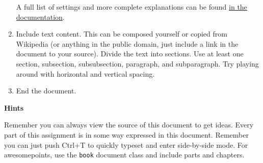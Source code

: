 \documentclass[a4paper,10pt]{article}
\begin{document}
\begin{enumerate}
\vspace{1em}

A full list of settings and more complete explanations can be found
\href{ftp://ftp.tex.ac.uk/tex-archive/macros/latex/contrib/geometry/geometry.pdf}{in
the documentation}.

\vspace{1em}

\item Include text content. This can be composed yourself or copied from
Wikipedia (or anything in the public domain, just include a link in the document
to your source). Divide the text into sections. Use at least one section,
subsection, subsubsection, paragraph, and subparagraph. Try playing around with horizontal and vertical spacing.

\item End the document.

\end{enumerate}

\noindent\large{\textbf{Hints}}\normalsize

Remember you can always view the source of this document to get ideas. Every
part of this assignment is in some way expressed in this document. Remember you
can just push Ctrl+T to quickly typeset and enter side-by-side mode. For
awesomepoints, use the \texttt{book} document class and include parts and
chapters.
\end{document}
